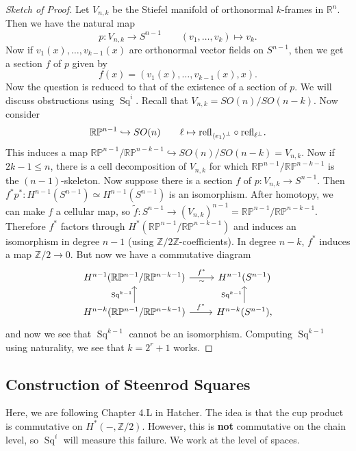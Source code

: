 \documentclass[leqno, openany]{memoir}
\theoremstyle{definition}
\theoremstyle{remark}
\theoremstyle{plain}
\theoremstyle{definition}
\theoremstyle{remark}
\newcommand{\R}{\mathbb{R}}
\newcommand{\Z}{\mathbb{Z}}
\renewcommand{\P}{\mathbb{P}}
\newcommand{\mr}[1]{\mathrm{#1}}
\newcommand{\wt}[1]{\widetilde{#1}}
\DeclareMathOperator{\Sq}{Sq}
\begin{document}
\begin{proof}[Sketch of Proof] Let $V_{n,k}$ be the Stiefel manifold of
    orthonormal $k$-frames in $\R^n$. Then we have the natural map \[ p \colon
    V_{n,k} \to S^{n-1} \qquad (v_1, \ldots, v_k) \mapsto v_k. \] Now if
    $v_1(x), \ldots, v_{k-1}(x)$ are orthonormal vector fields on $S^{n-1}$,
    then we get a section $f$ of $p$ given by \[ f(x) = (v_1(x), \ldots,
    v_{k-1}(x), x). \] Now the question is reduced to that of the existence of
    a section of $p$. We will discuss obstructions using $\Sq^i$. Recall that
    $V_{n,k} = SO(n)/SO(n-k)$. Now consider \[ \R\P^{n-1} \hookrightarrow SO(n)
    \qquad \ell \mapsto \mr{refl}_{\ev{e_1}^{\perp}} \circ
\mr{refl}_{\ell^{\perp}}. \] This induces a map $\R\P^{n-1}/\R\P^{n-k-1}
\hookrightarrow SO(n) / SO(n-k) = V_{n,k}$. Now if $2k-1 \leq n$, there is a
cell decomposition of $V_{n,k}$ for which $\R\P^{n-1}/\R\P^{n-k-1}$ is the
$(n-1)$-skeleton. Now suppose there is a section $f$ of $p \colon V_{n,k} \to
S^{n-1}$. Then $f^* p^* \colon H^{n-1}(S^{n-1}) \simeq H^{n-1}(S^{n-1})$ is an
isomorphism. After homotopy, we can make $f$ a cellular map, so $\wt{f} \colon
S^{n-1} \to {(V_{n,k})}^{n-1} = \R\P^{n-1}/\R\P^{n-k-1}$. Therefore $f^*$
factors through $H^*(\R\P^{n-1}/\R\P^{n-k-1})$ and induces an isomorphism in
degree $n-1$ (using $\Z/2\Z$-coefficients). In degree $n-k$, $f^*$ induces a
map $\Z/2 \to 0$. But now we have a commutative diagram \begin{equation*}
    \begin{tikzcd} H^{n-1}(\R\P^{n-1}/\R\P^{n-k-1}) \arrow{r}{f^*}[swap]{\sim}
    & H^{n-1}(S^{n-1}) \\ H^{n-k}(\R\P^{n-1}/\R\P^{n-k-1}) \arrow{r}{f^*}
        \arrow{u}{\Sq^{k-1}} & H^{n-k}(S^{n-1}) \arrow{u}{\Sq^{k-1}},
    \end{tikzcd} \end{equation*} and now we see that $\Sq^{k-1}$ cannot be an
isomorphism. Computing $\Sq^{k-1}$ using naturality, we see that $k = 2^r + 1$
works.  \end{proof}

\subsection{Construction of Steenrod Squares}%
\label{sub:construction_of_steenrod_squares}

Here, we are following Chapter 4.L in Hatcher. The idea is that the cup product
is commutative on $H^*(-, \Z/2)$. However, this is \textbf{not} commutative on
the chain level, so $\Sq^i$ will measure this failure. We work at the level of
spaces.
\end{document}
